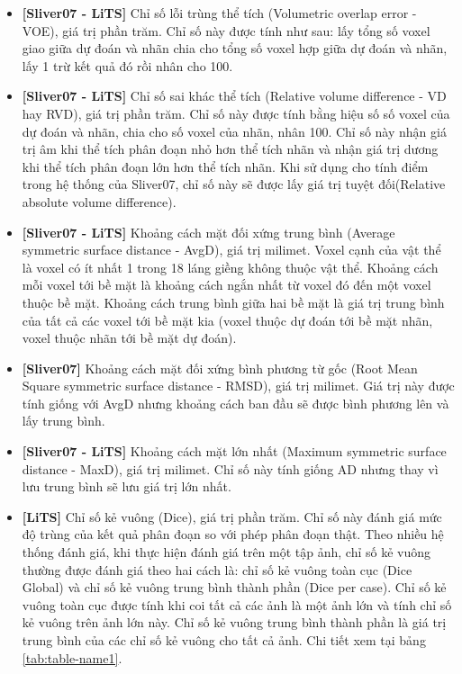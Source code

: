 \begin{itemize}
    \item \textbf{[Sliver07 - LiTS]} Chỉ số lỗi trùng thể tích (Volumetric overlap error - VOE), giá trị phần trăm. Chỉ số này được tính như sau: lấy tổng số voxel giao giữa dự đoán và nhãn chia cho tổng số voxel hợp giữa dự đoán và nhãn, lấy 1 trừ kết quả đó rồi nhân cho 100.
    \item \textbf{[Sliver07 - LiTS]} Chỉ số sai khác thể tích (Relative volume difference - VD hay RVD), giá trị phần trăm. Chỉ số này được tính bằng hiệu số số voxel của dự đoán và nhãn, chia cho  số voxel của nhãn, nhân 100. Chỉ số này nhận giá trị âm khi thể tích phân đoạn nhỏ hơn thể tích nhãn và nhận giá trị dương khi thể tích phân đoạn lớn hơn thể tích nhãn. Khi sử dụng cho tính điểm trong hệ thống của Sliver07, chỉ số này sẽ được lấy giá trị tuyệt đối(Relative absolute volume difference).
    \item \textbf{[Sliver07 - LiTS]} Khoảng cách mặt đối xứng trung bình (Average symmetric surface distance - AvgD), giá trị milimet. Voxel cạnh của vật thể là voxel có ít nhất 1 trong 18 láng giềng không thuộc vật thể. Khoảng cách mỗi voxel tới bề mặt là khoảng cách ngắn nhất từ voxel đó đến một voxel thuộc bề mặt. Khoảng cách trung bình giữa hai bề mặt là giá trị trung bình của tất cả các voxel tới bề mặt kia (voxel thuộc dự đoán tới bề mặt nhãn, voxel thuộc nhãn tới bề mặt dự đoán).
    \item \textbf{[Sliver07]} Khoảng cách mặt đối xứng bình phương từ gốc (Root Mean Square symmetric surface distance - RMSD), giá trị milimet. Giá trị này được tính giống với  AvgD nhưng khoảng cách ban đầu sẽ được bình phương lên và lấy trung bình.
    \item \textbf{[Sliver07 - LiTS]} Khoảng cách mặt lớn nhất (Maximum symmetric surface distance - MaxD), giá trị milimet. Chỉ số này tính giống AD nhưng thay vì lưu trung bình sẽ lưu giá trị lớn nhất.
    \item \textbf{[LiTS]} Chỉ số kẻ vuông (Dice), giá trị phần trăm. Chỉ số này đánh giá mức độ trùng của kết quả phân đoạn so với phép phân đoạn thật. Theo nhiều hệ thống đánh giá, khi thực hiện đánh giá trên một tập ảnh, chỉ số kẻ vuông thường được đánh giá theo hai cách là: chỉ số kẻ vuông toàn cục (Dice Global) và chỉ số kẻ vuông trung bình thành phần (Dice per case). Chỉ số kẻ vuông toàn cục được tính khi coi tất cả các ảnh là một ảnh lớn và tính chỉ số kẻ vuông trên ảnh lớn này. Chỉ số kẻ vuông trung bình thành phần là giá trị trung bình của các chỉ số kẻ vuông cho tất cả ảnh. Chi tiết xem tại bảng \ref{tab:table-name1}.
\end{itemize}
